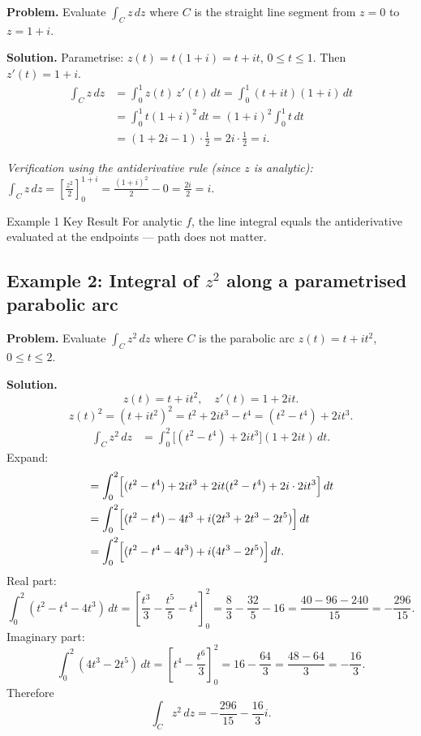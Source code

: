 \documentclass[12pt,a4paper]{article}
\begin{document}
\textbf{Problem.} Evaluate $\displaystyle\int_C z\,dz$ where $C$ is the
straight line segment from $z = 0$ to $z = 1 + i$.

\textbf{Solution.}
Parametrise: $z(t) = t(1+i) = t + it$, $0 \le t \le 1$.
Then $z'(t) = 1 + i$.
\begin{align*}
  \int_C z\,dz
  &= \int_0^1 z(t)\,z'(t)\,dt
   = \int_0^1 (t + it)(1 + i)\,dt \\
  &= \int_0^1 t(1+i)^2\,dt
   = (1+i)^2 \int_0^1 t\,dt \\
  &= (1 + 2i - 1)\cdot\frac{1}{2}
   = 2i \cdot \frac{1}{2}
   = i.
\end{align*}

\textit{Verification using the antiderivative rule (since $z$ is analytic):}
$\int_C z\,dz = \left[\frac{z^2}{2}\right]_0^{1+i}
= \frac{(1+i)^2}{2} - 0 = \frac{2i}{2} = i$. \checkmark

\begin{learnbox}{Example 1 Key Result}
For analytic $f$, the line integral equals the antiderivative evaluated at
the endpoints --- path does not matter.
\end{learnbox}

\subsection*{Example 2: Integral of $z^2$ along a parametrised parabolic arc}

\textbf{Problem.} Evaluate $\displaystyle\int_C z^2\,dz$ where $C$ is the
parabolic arc $z(t) = t + it^2$, $0 \le t \le 2$.

\textbf{Solution.}
\[
  z(t) = t + it^2, \quad z'(t) = 1 + 2it.
\]
\[
  z(t)^2 = (t + it^2)^2 = t^2 + 2it^3 - t^4 = (t^2 - t^4) + 2it^3.
\]
\begin{align*}
  \int_C z^2\,dz
  &= \int_0^2 \bigl[(t^2-t^4)+2it^3\bigr](1+2it)\,dt.
\end{align*}
Expand:
\begin{align*}
  &= \int_0^2 \Bigl[(t^2-t^4) + 2it^3 + 2it(t^2-t^4) + 2i\cdot 2it^3\Bigr]\,dt \\
  &= \int_0^2 \Bigl[(t^2-t^4) - 4t^3 + i(2t^3 + 2t^3 - 2t^5)\Bigr]\,dt \\
  &= \int_0^2 \Bigl[(t^2-t^4-4t^3) + i(4t^3 - 2t^5)\Bigr]\,dt.
\end{align*}
Real part:
\[
  \int_0^2 (t^2 - t^4 - 4t^3)\,dt
  = \left[\frac{t^3}{3} - \frac{t^5}{5} - t^4\right]_0^2
  = \frac{8}{3} - \frac{32}{5} - 16
  = \frac{40 - 96 - 240}{15}
  = -\frac{296}{15}.
\]
Imaginary part:
\[
  \int_0^2 (4t^3 - 2t^5)\,dt
  = \left[t^4 - \frac{t^6}{3}\right]_0^2
  = 16 - \frac{64}{3}
  = \frac{48 - 64}{3}
  = -\frac{16}{3}.
\]
Therefore
\[
  \int_C z^2\,dz = -\frac{296}{15} - \frac{16}{3}i.
\]
\end{document}
